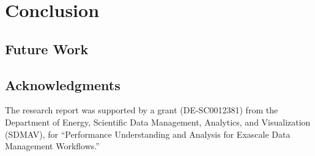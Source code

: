 
\section{Conclusion}
%
%

\subsection{Future Work}
%


\subsection{Acknowledgments}

The research report was supported by a grant (DE-SC0012381) from the
Department of Energy, Scientific Data Management, Analytics, and
Visualization (SDMAV), for ``Performance Understanding and Analysis
for Exascale Data Management Workflows.''



